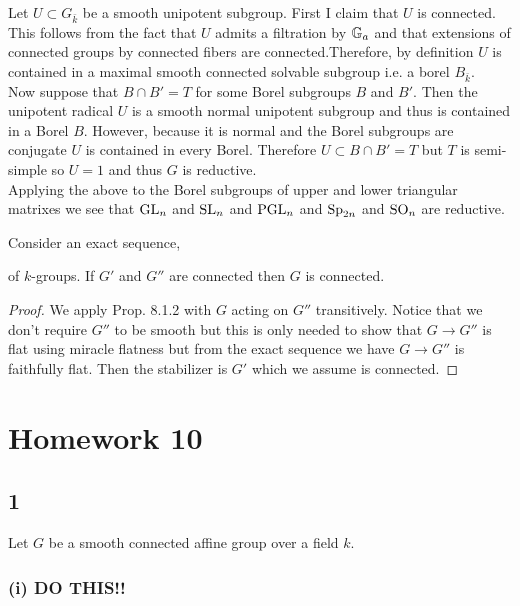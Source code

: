 \documentclass[12pt]{article}
\begin{document}
Let $U \subset G_{\bar{k}}$ be a smooth unipotent subgroup. First I claim that $U$ is connected. This follows from the fact that $U$ admits a filtration by ${\mathbb{G}_a}$ and that extensions of connected groups by connected fibers are connected.Therefore, by definition $U$ is contained in a maximal smooth connected solvable subgroup i.e. a borel $B_{\bar{k}}$. 
\bigskip\\
Now suppose that $B \cap B' = T$ for some Borel subgroups $B$ and $B'$. Then the unipotent radical $U$ is a smooth normal unipotent subgroup and thus is contained in a Borel $B$. However, because it is normal and the Borel subgroups are conjugate $U$ is contained in every Borel. Therefore $U \subset B \cap B' = T$ but $T$ is semi-simple so $U = 1$ and thus $G$ is reductive.
\bigskip\\
Applying the above to the Borel subgroups of upper and lower triangular matrixes we see that $\mathrm{GL}_n$ and $\mathrm{SL}_n$ and $\mathrm{PGL}_n$ and $\mathrm{Sp}_{2n}$ and $\mathrm{SO}_n$ are reductive.

\begin{lemma}
Consider an exact sequence,
\begin{center}
\end{center}
of $k$-groups. If $G'$ and $G''$ are connected then $G$ is connected.
\end{lemma}

\begin{proof}
We apply Prop. 8.1.2 with $G$ acting on $G''$ transitively. Notice that we don't require $G''$ to be smooth but this is only needed to show that $G \to G''$ is flat using miracle flatness but from the exact sequence we have $G \to G''$ is faithfully flat. Then the stabilizer is $G'$ which we assume is connected. 
\end{proof}

\section{Homework 10}

\subsection{1}

Let $G$ be a smooth connected affine group over a field $k$.

\subsubsection{(i) DO THIS!!}
\end{document}
